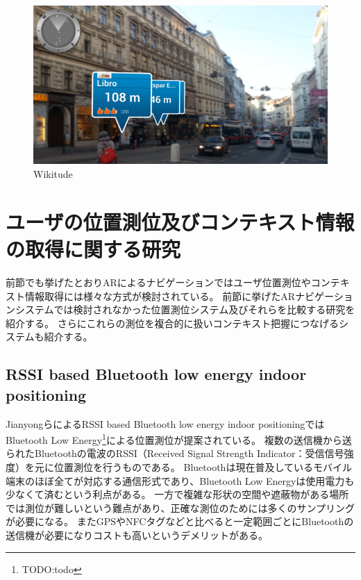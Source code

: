 \begin{figure}[h]
  \centering 
  \includegraphics[width=120mm]{images/Wikitude.png}
  \caption{Wikitude} \label{fig:Wikitude}
\end{figure}



\section{ユーザの位置測位及びコンテキスト情報の取得に関する研究}
前節でも挙げたとおりARによるナビゲーションではユーザ位置測位やコンテキスト情報取得には様々な方式が検討されている。
前節に挙げたARナビゲーションシステムでは検討されなかった位置測位システム及びそれらを比較する研究を紹介する。
さらにこれらの測位を複合的に扱いコンテキスト把握につなげるシステムも紹介する。

\subsection{RSSI based Bluetooth low energy indoor positioning}
JianyongらによるRSSI based Bluetooth low energy indoor positioning\cite{7275525}ではBluetooth Low Energy\footnote{\textsf{TODO:todo}}による位置測位が提案されている。
複数の送信機から送られたBluetoothの電波のRSSI（Received Signal Strength Indicator：受信信号強度）を元に位置測位を行うものである。
Bluetoothは現在普及しているモバイル端末のほぼ全てが対応する通信形式であり、Bluetooth Low Energyは使用電力も少なくて済むという利点がある。
一方で複雑な形状の空間や遮蔽物がある場所では測位が難しいという難点があり、正確な測位のためには多くのサンプリングが必要になる。
またGPSやNFCタグなどと比べると一定範囲ごとにBluetoothの送信機が必要になりコストも高いというデメリットがある。


